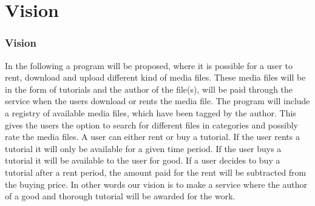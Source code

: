 \part{Vision}

\section{Vision}
In the following a program will be proposed, where it is possible for a user to rent, download and upload different kind of media files. These media files will be in the form of tutorials and the author of the file(s), will be paid through the service when the users download or rents the media file. The program will include a registry of available media files, which have been tagged by the author. This gives the users the option to search for different files in categories and possibly rate the media files.
A user can either rent or buy a tutorial. If the user rents a tutorial it will only be available for a given time period. If the user buys a tutorial it will be available to the user for good. If a user decides to buy a tutorial after a rent period, the amount paid for the rent will be subtracted from the buying price. 
In other words our vision is to make a service where the author of a good and thorough tutorial will be awarded for the work.